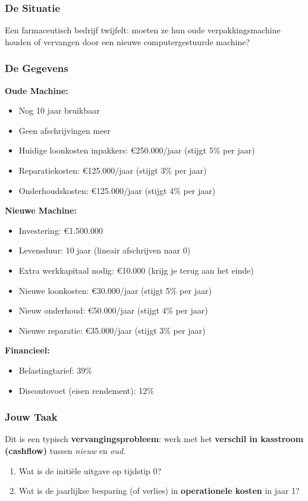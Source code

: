 \documentclass[a4paper,11pt]{article}
\begin{document}
\newpage

\begin{oefenblok}[title=Investeringsanalyse — De Astrazenetech Case]

\subsubsection*{De Situatie}
Een farmaceutisch bedrijf twijfelt: moeten ze hun oude verpakkingsmachine houden of vervangen door een nieuwe computergestuurde machine?

\subsubsection*{De Gegevens}

\textbf{Oude Machine:}
\begin{itemize}
    \item Nog 10 jaar bruikbaar
    \item Geen afschrijvingen meer
    \item Huidige loonkosten inpakkers: €250.000/jaar (stijgt 5\% per jaar)
    \item Reparatiekosten: €125.000/jaar (stijgt 3\% per jaar)
    \item Onderhoudskosten: €125.000/jaar (stijgt 4\% per jaar)
\end{itemize}

\textbf{Nieuwe Machine:}
\begin{itemize}
    \item Investering: €1.500.000
    \item Levensduur: 10 jaar (lineair afschrijven naar 0)
    \item Extra werkkapitaal nodig: €10.000 (krijg je terug aan het einde)
    \item Nieuwe loonkosten: €30.000/jaar (stijgt 5\% per jaar)
    \item Nieuw onderhoud: €50.000/jaar (stijgt 4\% per jaar)
    \item Nieuwe reparatie: €35.000/jaar (stijgt 3\% per jaar)
\end{itemize}

\textbf{Financieel:}
\begin{itemize}
    \item Belastingtarief: 39\%
    \item Discontovoet (eisen rendement): 12\%
\end{itemize}

\subsubsection*{Jouw Taak}
Dit is een typisch \textbf{vervangingsprobleem}: 
werk met het \textbf{verschil in kasstroom (cashflow)} tussen \textit{nieuw} en \textit{oud}.
\begin{enumerate}
    \item Wat is de initiële uitgave op tijdstip 0?
    \item Wat is de jaarlijkse besparing (of verlies) in \textbf{operationele kosten} in jaar 1?
\end{enumerate}


\end{oefenblok}
\end{document}
